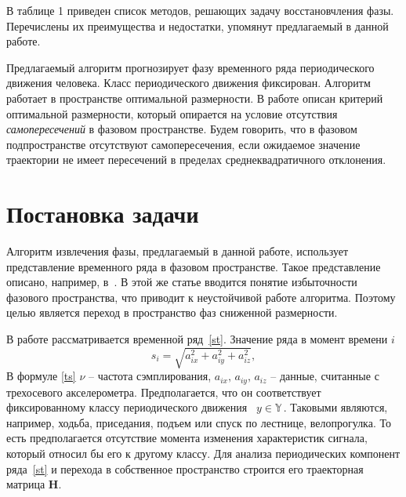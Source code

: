 \documentclass[12pt, twoside]{article}
\theoremstyle{definition}
\def\RR{\mathbb R}
\begin{document}
В таблице 1 приведен список методов, решающих задачу восстановчления фазы. Перечислены их преимущества и недостатки, упомянут предлагаемый в данной работе.

Предлагаемый алгоритм прогнозирует фазу временного ряда периодического движения человека. Класс периодического движения фиксирован. Алгоритм работает в пространстве оптимальной размерности.
В работе описан критерий оптимальной размерности, который опирается на условие отсутствия \emph{самопересечений} в фазовом пространстве. Будем говорить, что в фазовом подпространстве отсутствуют самопересечения, если ожидаемое значение траектории не имеет пересечений в пределах среднеквадратичного отклонения.

\section{Постановка задачи}
Алгоритм извлечения фазы, предлагаемый в данной работе, использует представление временного ряда в фазовом пространстве. Такое представление описано, например, в~\cite{usmanova}. В этой же статье вводится понятие избыточности фазового пространства, что приводит к неустойчивой работе алгоритма. Поэтому целью является переход в пространство фаз сниженной размерности. 

В работе рассматривается временной ряд~\eqref{st}. Значение ряда в момент времени $i$
    \begin{equation}\label{ts}
        s_i = \sqrt{a_{ix}^2 + a_{iy}^2 + a_{iz}^2},
    \end{equation}
В формуле \eqref{ts} $\nu$ -- частота сэмплирования, $a_{ix},\,a_{iy},\,a_{iz}$ -- данные, считанные с трехосевого акселерометра.
Предполагается, что он соответствует фиксированному классу периодического движения~ $y\in\mathbb{Y}\,$. Таковыми являются, например, ходьба, приседания, подъем или спуск по лестнице, велопрогулка. То есть предполагается отсутствие момента изменения характеристик сигнала, который относил бы его к другому классу.
Для анализа периодических компонент ряда~\eqref{st} и перехода в собственное пространство строится его траекторная матрица $\mathbf{H}$.
\end{document}

